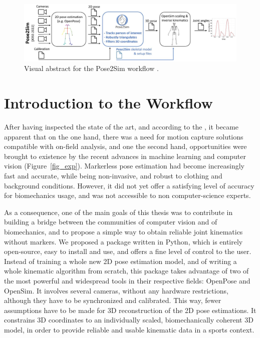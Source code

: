 \pagebreak
\minitoc

\vspace*{3cm}

\begin{figure}[hbtp]
	\centering
	\def\svgwidth{1\columnwidth}
	\fontsize{10pt}{10pt}\selectfont
	\includegraphics[width=\linewidth]{"../Intro/Figures/Fig_VisAbstract1.JPG"}
      \caption{Visual abstract for the Pose2Sim workflow \cite{Pagnon2022b}.}
	\label{fig_visabstract1}
\end{figure}

\newpage


\section{Introduction to the Workflow}

After having inspected the state of the art, and according to the , it became apparent that on the one hand, there was a need for motion capture solutions compatible with on-field analysis, and one the second hand, opportunities were brought to existence by the recent advances in machine learning and computer vision (Figure~\ref{fig_exp}). Markerless pose estimation had become increasingly fast and accurate, while being non-invasive, and robust to clothing and background conditions. However, it did not yet offer a satisfying level of accuracy for biomechanics usage, and was not accessible to non computer-science experts.

As a consequence, one of the main goals of this thesis was to contribute in building a bridge between the communities of computer vision and of biomechanics, and to propose a simple way to obtain reliable joint kinematics without markers. We proposed a package written in Python, which is entirely open-source, easy to install and use, and offers a fine level of control to the user. Instead of training a whole new 2D pose estimation model, and of writing a whole kinematic algorithm from scratch, this package takes advantage of two of the most powerful and widespread tools in their respective fields: OpenPose and OpenSim. It involves several cameras, without any hardware restrictions, although they have to be synchronized and calibrated. This way, fewer assumptions have to be made for 3D reconstruction of the 2D pose estimations. It constrains 3D coordinates to an individually scaled, biomechanically coherent 3D model, in order to provide reliable and usable kinematic data in a sports context. 

